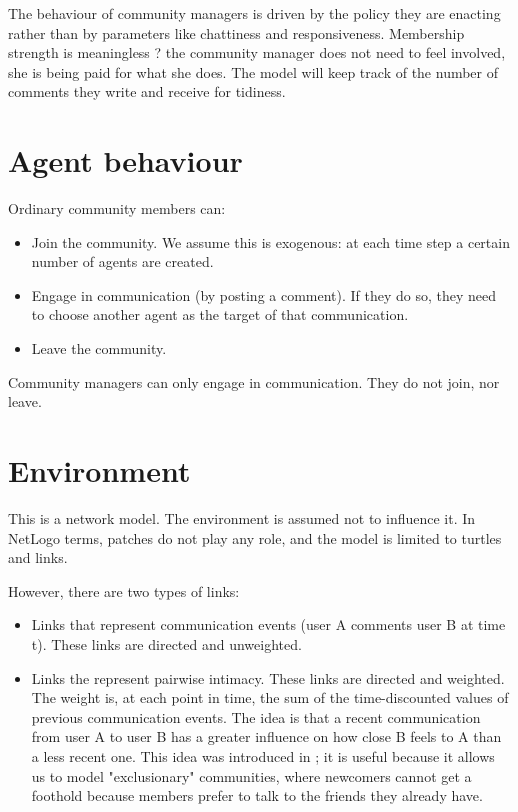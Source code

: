 \documentclass{article}
\begin{document}
The behaviour of community managers is driven by the policy they are enacting rather than by parameters like chattiness and responsiveness. Membership strength is meaningless ? the community manager does not need to feel involved, she is being paid for what she does. The model will keep track of the number of comments they write and receive for tidiness.

\section{Agent behaviour}

Ordinary community members can:

\begin{itemize}
\item Join the community. We assume this is exogenous: at each time step a certain number of agents are created.
\item Engage in communication (by posting a comment). If they do so, they need to choose another agent as the target of that communication. 
\item Leave the community.
\end{itemize}

Community managers can only engage in communication. They do not join, nor leave. 

\section{Environment}

This is a network model. The environment is assumed not to influence it. In NetLogo terms, patches do not play any role, and the model is limited to turtles and links.

However, there are two types of links:
\begin{itemize}
\item Links that represent communication events (user A comments user B at time t). These links are directed and unweighted.
\item Links the represent pairwise intimacy. These links are directed and weighted. The weight is, at each point in time, the sum of the time-discounted values of previous communication events. The idea is that a recent communication from user A to user B has a greater influence on how close B feels to A than a less recent one. This idea was introduced in \cite{kim2015group}; it is useful because it allows us to model "exclusionary" communities, where newcomers cannot get a foothold because members prefer to talk to the friends they already have. 
\end{itemize}
\end{document}

